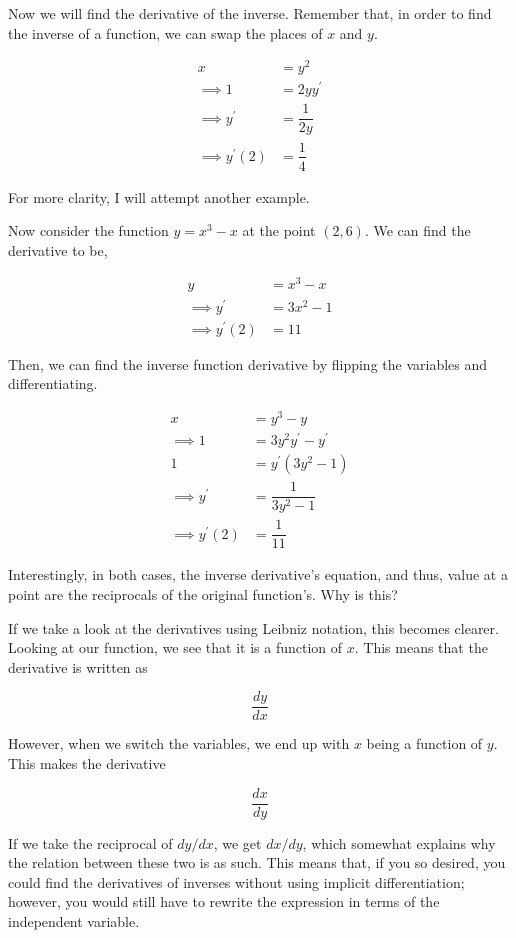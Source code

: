 Now we will find the derivative of the inverse. Remember that, in order to find the inverse of a function, we can swap the places of \( x \) and \( y \).

\begin{align}
    x &= y^2 \\
    \implies 1 &= 2y y^\prime \\
    \implies y^\prime &= \dfrac{1}{2y} \\
    \implies y^\prime \left( 2 \right) &= \dfrac{1}{4}
\end{align}

For more clarity, I will attempt another example.

Now consider the function \( y = x^3 - x \) at the point \( \left( 2, 6 \right) \). We can find the derivative to be,

\begin{align}
    y &= x^3 - x \\
    \implies y^\prime &= 3x^2 - 1 \\
    \implies y^\prime \left( 2 \right) &= 11
\end{align}

Then, we can find the inverse function derivative by flipping the variables and differentiating.

\begin{align}
    x &= y^3 - y \\
    \implies 1 &= 3y^2 y^\prime - y^\prime \\
    1 &= y^\prime \left( 3y^2 - 1 \right) \\
    \implies y^\prime &= \dfrac{1}{3y^2 - 1} \\
    \implies y^\prime \left( 2 \right) &= \dfrac{1}{11}
\end{align}

Interestingly, in both cases, the inverse derivative's equation, and thus, value at a point are the reciprocals of the original function's. Why is this?

If we take a look at the derivatives using Leibniz notation, this becomes clearer. Looking at our function, we see that it is a function of \( x \). This means that the derivative is written as

\[ \dfrac{dy}{dx} \]

However, when we switch the variables, we end up with \( x \) being a function of \( y \). This makes the derivative

\[ \dfrac{dx}{dy} \]

If we take the reciprocal of \( dy / dx \), we get \( dx / dy \), which somewhat explains why the relation between these two is as such. This means that, if you so desired, you could find the derivatives of inverses without using implicit differentiation; however, you would still have to rewrite the expression in terms of the independent variable.

